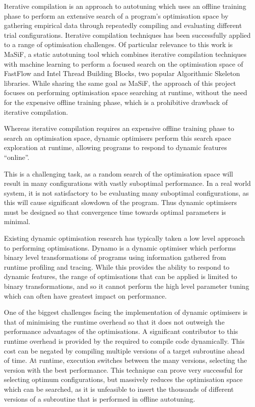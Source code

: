 Iterative compilation is an approach to autotuning which uses an
offline training phase to perform an extensive search of a program's
optimisation space by gathering empirical data through repeatedly
compiling and evaluating different trial configurations. Iterative
compilation techniques has been successfully applied to a range of
optimisation challenges. Of particular relevance to this work is
MaSiF, a static autotuning tool which combines iterative compilation
techniques with machine learning to perform a focused search on the
optimisation space of FastFlow and Intel Thread Building Blocks, two
popular Algorithmic Skeleton libraries. While sharing the same goal as
MaSiF, the approach of this project focuses on performing optimisation
space searching at runtime, without the need for the expensive offline
training phase, which is a prohibitive drawback of iterative
compilation.

Whereas iterative compilation requires an expensive offline training
phase to search an optimisation space, dynamic optimisers perform this
search space exploration at runtime, allowing programs to respond to
dynamic features ``online''.

This is a challenging task, as a random search of the optimisation
space will result in many configurations with vastly suboptimal
performance. In a real world system, it is not satisfactory to be
evaluating many suboptimal configurations, as this will cause
significant slowdown of the program. Thus dynamic optimisers must be
designed so that convergence time towards optimal parameters is
minimal.

Existing dynamic optimisation research has typically taken a low level
approach to performing optimisations. Dynamo is a dynamic optimiser
which performs binary level transformations of programs using
information gathered from runtime profiling and tracing. While this
provides the ability to respond to dynamic features, the range of
optimisations that can be applied is limited to binary
transformations, and so it cannot perform the high level parameter
tuning which can often have greatest impact on performance.

One of the biggest challenges facing the implementation of dynamic
optimisers is that of minimising the runtime overhead so that it does
not outweigh the performance advantages of the optimisations. A
significant contributor to this runtime overhead is provided by the
required to compile code dynamically. This cost can be negated by
compiling multiple versions of a target subroutine ahead of time. At
runtime, execution switches between the many versions, selecting the
version with the best performance. This technique can prove very
successful for selecting optimum configurations, but massively reduces
the optimisation space which can be searched, as it is unfeasible to
insert the thousands of different versions of a subroutine that is
performed in offline autotuning.

